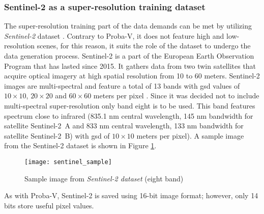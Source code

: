 \subsubsection{Sentinel-2 as a super-resolution training dataset}
The super-resolution training part of the data demands can be met by utilizing \textit{Sentinel-2} dataset \cite{esa-sentinel}.
Contrary to Proba-V, it does not feature high and low-resolution scenes, for this reason, it suits the role of the dataset to undergo the data generation process.
Sentinel-2 is a part of the European Earth Observation Program that has lasted since 2015.
It gathers data from two twin satellites that acquire optical imagery at high spatial resolution from 10 to 60 meters.
Sentinel-2 images are multi-spectral and feature a total of 13 bands with \gls{gsd} values of $ 10 \times 10 $, $ 20 \times 20 $ and $ 60 \times 60 $ meters per pixel \cite{tas-sentinel}.
Since it was decided not to include multi-spectral super-resolution only band eight is to be used.
This band features spectrum close to infrared (835.1 nm central wavelength, 145 nm bandwidth for satellite Sentinel-2~A and 833 nm central wavelength, 133 nm bandwidth for satellite Sentinel-2~B) with \gls{gsd} of $ 10 \times 10 $ meters per pixel).
A sample image from the Sentinel-2 dataset is shown in Figure \ref{fig:sentinel_sample}.
\begin{figure}
	\centering
    \texttt{[image: sentinel\_sample]}
    \caption{Sample image from \textit{Sentinel-2 dataset} (eight band)}
    \label{fig:sentinel_sample}
\end{figure}
As with Proba-V, Sentinel-2 is saved using 16-bit image format; however, only 14 bits store useful pixel values.

